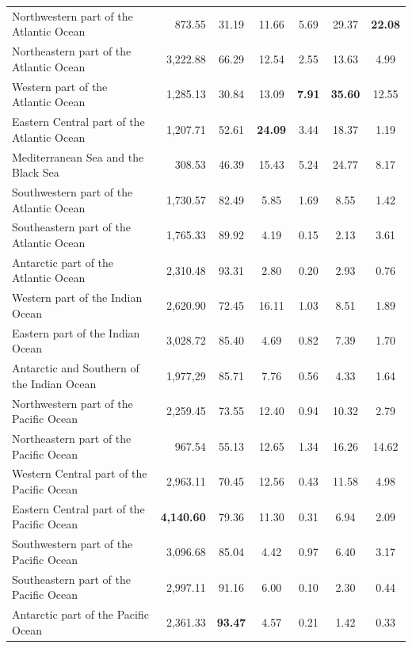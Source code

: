 \documentclass[12pt,authoryear]{elsarticle}
\providecommand{\DIFaddendFL}{} %
\begin{document}
\begin{table}[h]
{\begin{tabular}{ l r  c  c   c  c c }
Northwestern part of the Atlantic Ocean    &    873.55 & 31.19 & 11.66 &  5.69 & 29.37 & \textbf{22.08} \\ 
Northeastern part of the Atlantic Ocean    &  3,222.88 & 66.29 & 12.54 &  2.55 & 13.63 &  4.99 \\ 
Western part of the Atlantic Ocean         &  1,285.13 & 30.84 & 13.09 & \textbf{7.91} & \textbf{35.60} & 12.55\\ 
Eastern Central part of the Atlantic Ocean &  1,207.71 & 52.61 & \textbf{24.09}&  3.44 & 18.37 &  1.19 \\ 
Mediterranean Sea and the Black Sea        &    308.53 & 46.39 & 15.43 &  5.24 & 24.77 &  8.17 \\ 
Southwestern part of the Atlantic Ocean    &  1,730.57 & 82.49 &  5.85 &  1.69 &  8.55 &  1.42 \\ 
Southeastern part of the Atlantic Ocean    &  1,765.33 & 89.92 &  4.19 &  0.15 &  2.13 &  3.61 \\ 
Antarctic part of the Atlantic Ocean       &  2,310.48 & 93.31 &  2.80 &  0.20 &  2.93 &  0.76 \\ 
Western part of the Indian Ocean           &  2,620.90 & 72.45 & 16.11 &  1.03 &  8.51 &  1.89 \\ 
Eastern part of the Indian Ocean           &  3,028.72 & 85.40 &  4.69 &  0.82 &  7.39 &  1.70 \\ 
Antarctic and Southern of the Indian Ocean &  1,977,29 & 85.71 &  7.76 &  0.56 &  4.33 &  1.64 \\ 
Northwestern part of the Pacific Ocean     &  2,259.45 & 73.55 & 12.40 &  0.94 & 10.32 &  2.79 \\ 
Northeastern part of the Pacific Ocean     &    967.54 & 55.13 & 12.65 &  1.34 & 16.26 & 14.62 \\ 
Western Central part of the Pacific Ocean  &  2,963.11 & 70.45 & 12.56 &  0.43 & 11.58 &  4.98 \\ 
Eastern Central part of the Pacific Ocean  & \textbf{4,140.60} & 79.36 & 11.30 &  0.31 &  6.94 &  2.09 \\ 
Southwestern part of the Pacific Ocean     &  3,096.68 & 85.04 &  4.42 &  0.97 &  6.40 &  3.17 \\ 
Southeastern part of the Pacific Ocean     &  2,997.11 & 91.16 &  6.00 &  0.10 &  2.30 &  0.44 \\ 
Antarctic part of the Pacific Ocean        &  2,361.33 & \textbf{93.47} & 4.57 &  0.21 &  1.42 &  0.33 \\ 
  \hline
   \hline
\end{tabular}
}
\DIFaddendFL \end{table}
\end{document}
